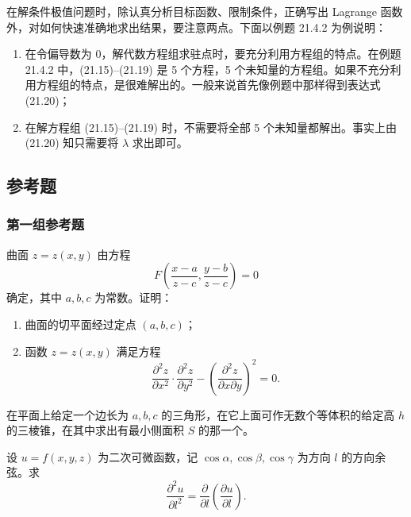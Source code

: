 在解条件极值问题时，除认真分析目标函数、限制条件，正确写出 Lagrange 函数外，对如何快速准确地求出结果，要注意两点。下面以例题 21.4.2 为例说明：
\begin{enumerate}[label=(\arabic*)]
  \item 在令偏导数为 $0$，解代数方程组求驻点时，要充分利用方程组的特点。在例题 21.4.2 中，(21.15)--(21.19) 是 5 个方程，5 个未知量的方程组。如果不充分利用方程组的特点，是很难解出的。一般来说首先像例题中那样得到表达式 (21.20)；
  \item 在解方程组 (21.15)--(21.19) 时，不需要将全部 5 个未知量都解出。事实上由 (21.20) 知只需要将 $\lambda$ 求出即可。
\end{enumerate}

\subsection{参考题}

\subsubsection*{第一组参考题}
\begin{xreferenceproblem}[1]
曲面 $z=z(x,y)$ 由方程
  \[
    F\left(\frac{x-a}{z-c},\frac{y-b}{z-c}\right)=0
  \]
  确定，其中 $a,b,c$ 为常数。证明：
  \begin{enumerate}[label=(\arabic*)]
    \item 曲面的切平面经过定点 $(a,b,c)$；
    \item 函数 $z=z(x,y)$ 满足方程
    \[
      \frac{\partial^2z}{\partial x^2}\cdot\frac{\partial^2z}{\partial y^2}
      -\left(\frac{\partial^2z}{\partial x\partial y}\right)^2=0.
    \]
  \end{enumerate}
\end{xreferenceproblem}

\begin{xreferenceproblem}[2]
在平面上给定一个边长为 $a,b,c$ 的三角形，在它上面可作无数个等体积的给定高 $h$ 的三棱锥，在其中求出有最小侧面积 $S$ 的那一个。
\end{xreferenceproblem}

\begin{xreferenceproblem}[3]
设 $u=f(x,y,z)$ 为二次可微函数，记 $\cos\alpha,\cos\beta,\cos\gamma$ 为方向 $l$ 的方向余弦。求
  \[
    \frac{\partial^2u}{\partial l^2}=\frac{\partial}{\partial l}\left(\frac{\partial u}{\partial l}\right).
  \]
\end{xreferenceproblem}

